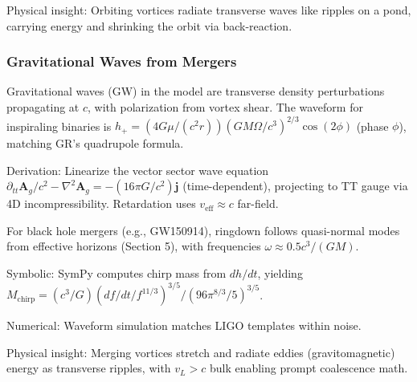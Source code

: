 Physical insight: Orbiting vortices radiate transverse waves like ripples on a pond, carrying energy and shrinking the orbit via back-reaction.

\medskip
\noindent
{}
\medskip

\subsubsection{Gravitational Waves from Mergers}

Gravitational waves (GW) in the model are transverse density perturbations propagating at $c$, with polarization from vortex shear. The waveform for inspiraling binaries is $h_+ = (4 G \mu / (c^2 r)) (G M \Omega / c^3)^{2/3} \cos(2 \phi)$ (phase $\phi$), matching GR's quadrupole formula.

Derivation: Linearize the vector sector wave equation $\partial_{tt} \mathbf{A}_g / c^2 - \nabla^2 \mathbf{A}_g = - (16\pi G / c^2) \mathbf{j}$ (time-dependent), projecting to TT gauge via 4D incompressibility. Retardation uses $v_{\text{eff}} \approx c$ far-field.

For black hole mergers (e.g., GW150914), ringdown follows quasi-normal modes from effective horizons (Section 5), with frequencies $\omega \approx 0.5 c^3 / (G M)$.

Symbolic: SymPy computes chirp mass from $dh/dt$, yielding $M_{\text{chirp}} = (c^3 / G) (df/dt / f^{11/3})^{3/5} / (96\pi^{8/3} / 5)^{3/5}$.

Numerical: Waveform simulation matches LIGO templates within noise.

Physical insight: Merging vortices stretch and radiate eddies (gravitomagnetic) energy as transverse ripples, with $v_L > c$ bulk enabling prompt coalescence math.

\medskip
\noindent
{}
\medskip

